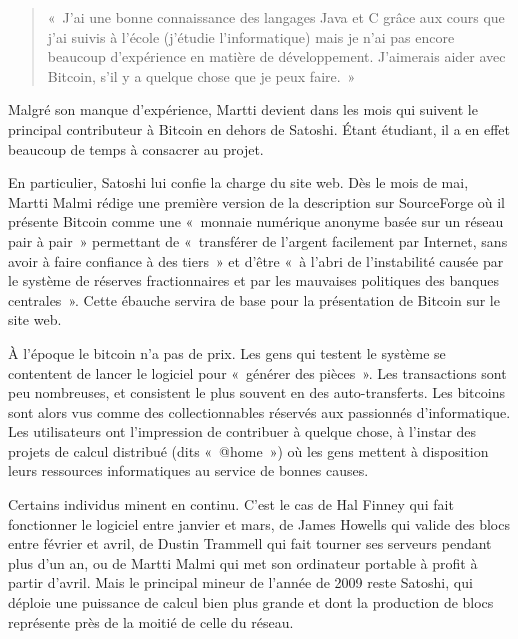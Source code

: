 \begin{quote}
«~J'ai une bonne connaissance des langages Java et C grâce aux cours que j'ai suivis à l'école (j'étudie l'informatique) mais je n'ai pas encore beaucoup d'expérience en matière de développement. J'aimerais aider avec Bitcoin, s'il y a quelque chose que je peux faire.~»
\end{quote}

Malgré son manque d'expérience, Martti devient dans les mois qui suivent le principal contributeur à Bitcoin en dehors de Satoshi. Étant étudiant, il a en effet beaucoup de temps à consacrer au projet.

En particulier, Satoshi lui confie la charge du site web. Dès le mois de mai, Martti Malmi rédige une première version de la description sur SourceForge où il présente Bitcoin comme une «~monnaie numérique anonyme basée sur un réseau pair à pair~» permettant de «~transférer de l'argent facilement par Internet, sans avoir à faire confiance à des tiers~» et d'être «~à l'abri de l'instabilité causée par le système de réserves fractionnaires et par les mauvaises politiques des banques centrales~». Cette ébauche servira de base pour la présentation de Bitcoin sur le site web.


À l'époque le bitcoin n'a pas de prix. Les gens qui testent le système se contentent de lancer le logiciel pour «~générer des pièces~». Les transactions sont peu nombreuses, et consistent le plus souvent en des auto-transferts. Les bitcoins sont alors vus comme des collectionnables réservés aux passionnés d'informatique. Les utilisateurs ont l'impression de contribuer à quelque chose, à l'instar des projets de calcul distribué (dits «~@home~») où les gens mettent à disposition leurs ressources informatiques au service de bonnes causes.

Certains individus minent en continu. C'est le cas de Hal Finney qui fait fonctionner le logiciel entre janvier et mars, de James Howells qui valide des blocs entre février et avril, de Dustin Trammell qui fait tourner ses serveurs pendant plus d'un an, ou de Martti Malmi qui met son ordinateur portable à profit à partir d'avril. Mais le principal mineur de l'année de 2009 reste Satoshi, qui déploie une puissance de calcul bien plus grande et dont la production de blocs représente près de la moitié de celle du réseau.


